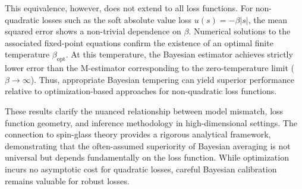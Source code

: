 \documentclass[11pt]{article}
\begin{document}
This equivalence, however, does not extend to all loss functions. For non-quadratic losses such as the soft absolute value loss $u(s) = -\beta|s|$, the mean squared error shows a non-trivial dependence on $\beta$. Numerical solutions to the associated fixed-point equations confirm the existence of an optimal finite temperature $\beta_{\mathrm{opt}}$. At this temperature, the Bayesian estimator achieves strictly lower error than the M-estimator corresponding to the zero-temperature limit ($\beta \to \infty$). Thus, appropriate Bayesian tempering can yield superior performance relative to optimization-based approaches for non-quadratic loss functions.

These results clarify the nuanced relationship between model mismatch, loss function geometry, and inference methodology in high-dimensional settings. The connection to spin-glass theory provides a rigorous analytical framework, demonstrating that the often-assumed superiority of Bayesian averaging is not universal but depends fundamentally on the loss function. While optimization incurs no asymptotic cost for quadratic losses, careful Bayesian calibration remains valuable for robust losses.
\end{document}

